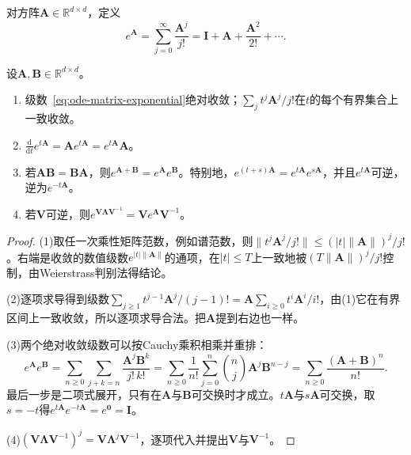 \begin{definition}[矩阵指数]
  \label{def:ode-matrix-exponential}
  对方阵$\bm A\in\mathbb R^{d\times d}$，定义
  \begin{equation}
    e^{\bm A}=\sum_{j=0}^\infty\frac{\bm A^j}{j!}=\bm I+\bm A+\frac{\bm A^2}{2!}+\cdots.
    \label{eq:ode-matrix-exponential}
  \end{equation}
\end{definition}

\begin{theorem}[矩阵指数的基本性质]
  \label{thm:ode-matrix-exponential-properties}
  设$\bm A,\bm B\in\mathbb R^{d\times d}$。
  \begin{enumerate}
    \item 级数~\eqref{eq:ode-matrix-exponential}绝对收敛；$\sum_jt^j\bm A^j/j!$在$t$的每个有界集合上一致收敛。
    \item $\frac{\mathrm d}{\mathrm dt}e^{t\bm A}=\bm Ae^{t\bm A}=e^{t\bm A}\bm A$。
    \item 若$\bm A\bm B=\bm B\bm A$，则$e^{\bm A+\bm B}=e^{\bm A}e^{\bm B}$。特别地，$e^{(t+s)\bm A}=e^{t\bm A}e^{s\bm A}$，并且$e^{t\bm A}$可逆，逆为$e^{-t\bm A}$。
    \item 若$\bm V$可逆，则$e^{\bm V\bm\Lambda\bm V^{-1}}=\bm Ve^{\bm\Lambda}\bm V^{-1}$。
  \end{enumerate}
\end{theorem}

\begin{proof}
  (1)取任一次乘性矩阵范数，例如谱范数，则$\|t^j\bm A^j/j!\|\leq(|t|\|\bm A\|)^j/j!$。右端是收敛的数值级数$e^{|t|\|\bm A\|}$的通项，在$|t|\leq T$上一致地被$(T\|\bm A\|)^j/j!$控制，由Weierstrass判别法得结论。

  (2)逐项求导得到级数$\sum_{j\geq1}t^{j-1}\bm A^j/(j-1)!=\bm A\sum_{i\geq0}t^i\bm A^i/i!$，由(1)它在有界区间上一致收敛，所以逐项求导合法。把$\bm A$提到右边也一样。

  (3)两个绝对收敛级数可以按Cauchy乘积相乘并重排：
  \[
    e^{\bm A}e^{\bm B}=\sum_{n\geq0}\sum_{j+k=n}\frac{\bm A^j\bm B^k}{j!\,k!}
    =\sum_{n\geq0}\frac1{n!}\sum_{j=0}^n\binom nj\bm A^j\bm B^{n-j}
    =\sum_{n\geq0}\frac{(\bm A+\bm B)^n}{n!}.
  \]
  最后一步是二项式展开，只有在$\bm A$与$\bm B$可交换时才成立。$t\bm A$与$s\bm A$可交换，取$s=-t$得$e^{t\bm A}e^{-t\bm A}=e^{\bm0}=\bm I$。

  (4)$(\bm V\bm\Lambda\bm V^{-1})^j=\bm V\bm\Lambda^j\bm V^{-1}$，逐项代入并提出$\bm V$与$\bm V^{-1}$。
\end{proof}

